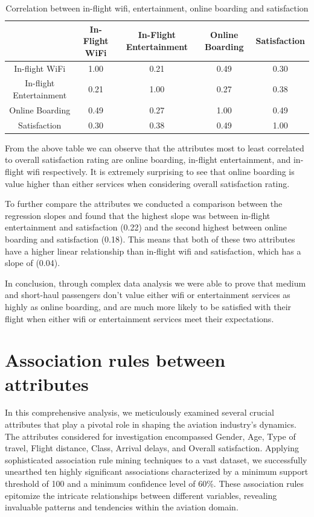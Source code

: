 \documentclass[11pt]{article}
\begin{document}
\begin{table}[!h]
    \centering
    \begin{tabular}{|c|c|c|c|c|}
        \hline
        &  In-Flight WiFi &  In-Flight Entertainment & Online Boarding & Satisfaction \\
        \hline
        In-flight WiFi     &   1.00  &  0.21 & 0.49 & 0.30 \\
        \hline
In-flight Entertainment     &   0.21 & 1.00 & 0.27 &  0.38 \\
        \hline
        Online Boarding     &   0.49 & 0.27 & 1.00 & 0.49 \\
        \hline
        Satisfaction     &   0.30 & 0.38 & 0.49 & 1.00 \\
        \hline
    \end{tabular}
    \caption{Correlation between in-flight wifi, entertainment, online boarding and satisfaction}
    \label{tab:corr-ifw-ife-ob-s}
\end{table}

From the above table we can observe that the attributes most to least correlated to overall satisfaction rating are online boarding, in-flight entertainment, and in-flight wifi respectively. It is extremely surprising to see that online boarding is value higher than either services when considering overall satisfaction rating. 

To further compare the attributes we conducted a comparison between the regression slopes and found that the highest slope was between in-flight entertainment and satisfaction (\num{0.22}) and the second highest between online boarding and satisfaction (\num{0.18}). This means that both of these two attributes have a higher linear relationship than in-flight wifi and satisfaction, which has a slope of (\num{0.04}). 

In conclusion, through complex data analysis we were able to prove that medium and short-haul passengers don't value either wifi or entertainment services as highly as online boarding, and are much more likely to be satisfied with their flight when either wifi or entertainment services meet their expectations.
    
    \hypertarget{question-4}{%
\section{Association rules between attributes}\label{question-4}}

In this comprehensive analysis, we meticulously examined several crucial attributes that play a pivotal role in shaping the aviation industry's dynamics. The attributes considered for investigation encompassed Gender, Age, Type of travel, Flight distance, Class, Arrival delays, and Overall satisfaction. Applying sophisticated association rule mining techniques to a vast dataset, we successfully unearthed ten highly significant associations characterized by a minimum support threshold of 100 and a minimum confidence level of 60\%. These association rules epitomize the intricate relationships between different variables, revealing invaluable patterns and tendencies within the aviation domain.
\end{document}
